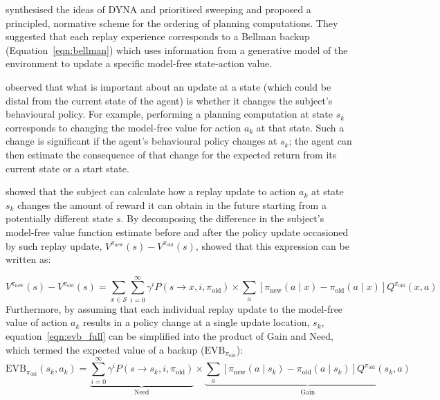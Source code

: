 \textcite{mattarPrioritizedMemoryAccess2018} synthesised the ideas of DYNA and prioritised sweeping and proposed a principled, normative scheme for the ordering of planning computations. They suggested that each replay experience corresponds to a Bellman backup (Equation~\ref{eqn:bellman}) which uses information from a generative model of the environment to update a specific model-free state-action value.

\textcite{mattarPrioritizedMemoryAccess2018} observed that what is important about an update at a state (which could be distal from the current state of the agent) is whether it changes the subject's behavioural policy. For example, performing a planning computation at state $s_k$ corresponds to changing the model-free value for action $a_k$ at that state. Such a change is significant if the agent's behavioural policy changes at $s_k$; the agent can then estimate the consequence of that change for the expected return from its current state or a start state. 


\textcite{mattarPrioritizedMemoryAccess2018} showed that the subject can calculate how a replay update to action $a_k$ at state $s_k$ changes the amount of reward it can obtain in the future starting from a potentially different  state $s$. By decomposing the difference in the subject's model-free value function estimate before and after the policy update occasioned by such replay update, $V^{\pi_{\text{new}}}(s)-V^{\pi_{\text{old}}}(s)$, \textcite{mattarPrioritizedMemoryAccess2018} showed that this expression can be written as:

\begin{equation}
    V^{\pi_{\text{new}}}(s)-V^{\pi_{\text{old}}}(s) = \sum_{x\in \mathcal{S}}\sum_{i=0}^{\infty} \gamma^i P(s\rightarrow x, i, \pi_{\text{old}}) \times \sum_{a} \left[\pi_{\text{new}}(a\mid x) - \pi_{\text{old}}(a\mid x) \right] Q^{\pi_{\text{old}}}(x, a)
    \label{eqn:evb_full}
\end{equation}
Furthermore, by assuming that each individual replay update to the model-free value of action $a_k$ results in a policy change at a single update location, $s_k$,  equation~\ref{eqn:evb_full} can be simplified into the product of Gain and Need, which \textcite{mattarPrioritizedMemoryAccess2018} termed the expected value of a backup ($\text{EVB}_{\pi_{\text{old}}}$):
\begin{equation}
    \text{EVB}_{\pi_{\text{old}}}(s_k, a_k) = \underbrace{\sum_{i=0}^{\infty} \gamma^i P(s\rightarrow s_k, i, \pi_{\text{old}})}_{\text{Need}} \times \underbrace{\sum_{a} \left[\pi_{\text{new}}(a\mid s_k) - \pi_{\text{old}}(a\mid s_k) \right] Q^{\pi_{\text{old}}}(s_k, a)}_{\text{Gain}}
    \label{eqn:evb_short}
\end{equation}


